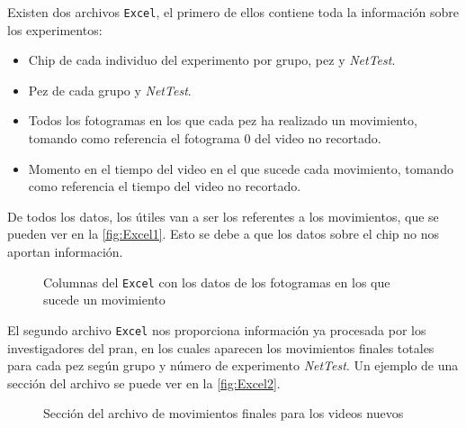 Existen dos archivos \texttt{Excel}, el primero de ellos contiene toda la información sobre los experimentos:
\begin{itemize}
    \item Chip de cada individuo del experimento por grupo, pez y \textit{NetTest}.
    \item Pez de cada grupo y \textit{NetTest}.
    \item Todos los fotogramas en los que cada pez ha realizado un movimiento, tomando como referencia el fotograma 0 del video no recortado.
    \item Momento en el tiempo del video en el que sucede cada movimiento, tomando como referencia el tiempo del video no recortado.
\end{itemize}

De todos los datos, los útiles van a ser los referentes a los movimientos, que se pueden ver en la \autoref{fig:Excel1}. Esto se debe a que los datos sobre el chip no nos aportan información.

\begin{figure}[H]
    \centering
    \caption{Columnas del \texttt{Excel} con los datos de los fotogramas en los que sucede un movimiento}
    \label{fig:Excel1}
\end{figure}
El segundo archivo \texttt{Excel} nos proporciona información ya procesada por los investigadores del \acrshort{pran}, en los cuales aparecen 
los movimientos finales totales para cada pez según grupo y número de experimento \textit{NetTest}. Un ejemplo de una sección del archivo se 
puede ver en la \autoref{fig:Excel2}.

\begin{figure}[H]
    \centering
    \caption{Sección del archivo de movimientos finales para los videos nuevos}
    \label{fig:Excel2}
\end{figure}

